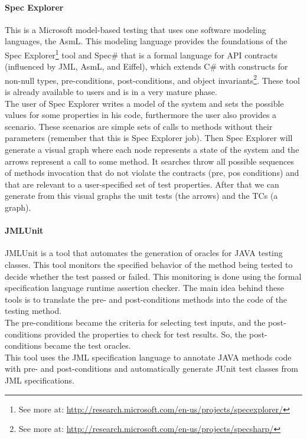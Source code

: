 \paragraph{Spec Explorer}
This is a Microsoft model-based testing that uses one software modeling languages, the \ac{AsmL}.
This modeling language provides the foundations of the Spec Explorer\footnote{See more at: \url{http://research.microsoft.com/en-us/projects/specexplorer/}} tool
and Spec\# that is a formal language for \ac{API} contracts (influenced by \ac{JML}, \ac{AsmL}, and Eiffel), which extends C\# with constructs for non-null types,
pre-conditions, post-conditions, and object invariants\footnote{See more at: \url{http://research.microsoft.com/en-us/projects/specsharp/}}.
These tool is already available to users and is in a very mature phase.\\
\indent The user of Spec Explorer writes a model of the system and sets the possible values for some properties in his code, furthermore the user also provides a scenario.
These scenarios are simple sets of calls to methods without their parameters (remember that this is Spec Explorer job).
Then Spec Explorer will generate a visual graph where each node represents a state of the system and the arrows represent a call to some method.
It searches throw all possible sequences of methods invocation that do not violate the contracts (pre, pos conditions) and
that are relevant to a user-specified set of test properties. After that we can generate from this visual graphs the unit tests (the arrows) and the
\ac{TC}s (a graph).

\paragraph{JMLUnit}
JMLUnit\cite{Cheon04thejml} is a tool that automates the generation of oracles for JAVA testing classes. This tool
monitors the specified behavior of the method being tested to decide whether the test passed or failed.
This monitoring is done using the formal specification language runtime assertion checker.
The main idea behind these tools is to translate the pre- and post-conditions methods into the code of the testing method.\\
The pre-conditions became the criteria for selecting test inputs, and the post-conditions provided the properties to check for
test results. So, the post-conditions became the test oracles.\\
This tool uses the \ac{JML}\cite{Burdy03anoverview} specification language to annotate JAVA methods code with pre- and post-conditions and
automatically generate JUnit test classes from \ac{JML} specifications.

